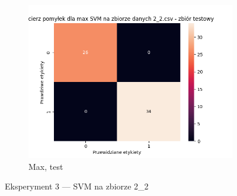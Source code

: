 \documentclass[12pt]{article}
\newcommand*{\subfigwidth}{0.24\textwidth}
\begin{document}
\begin{figure}[H]
\begin{subfigure}[t]{\subfigwidth}
        \includegraphics[width=\linewidth]{img/exp_3/svm/2_2/max/test_matrix.png}
        \caption{Max, test}
    \end{subfigure}

    \caption{Eksperyment 3 --- SVM na zbiorze 2\_2}
\end{figure}
\end{document}
